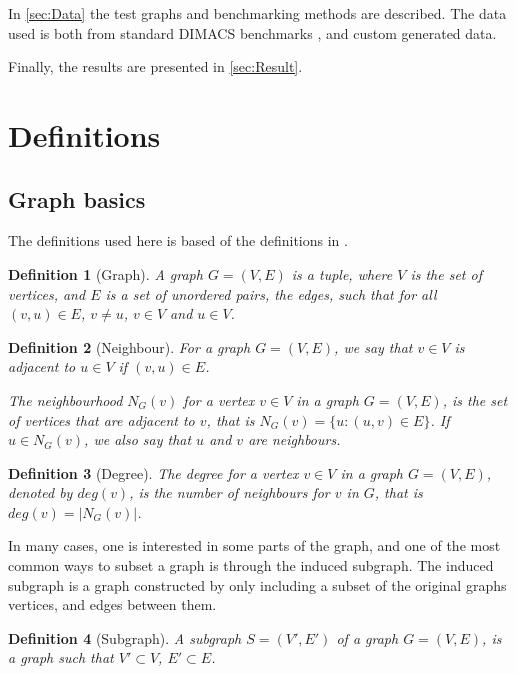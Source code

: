 \documentclass{amsart}
\newtheorem{definition}{Definition}[section]
\begin{document}
In \autoref{sec:Data} the test graphs and benchmarking methods are described. The data
used is both from standard DIMACS benchmarks \cite{DIMACS}, and custom generated data.

Finally, the results are presented in \autoref{sec:Result}.

\section{Definitions}
\label{sec:Definitions}

\subsection{Graph basics}
\label{sec:GraphBasics}

The definitions used here is based of the definitions in 
\cite{GraphBasics}.

\begin{definition}[Graph]
    A graph $G = (V,E)$ is a tuple, where $V$ is the set of vertices, and $E$ is
    a set of unordered pairs, the edges, such that for all $(v,u) \in E$,
    $v \neq u$, $v \in V$ and $u \in V$.
\end{definition}
\begin{definition}[Neighbour]
    For a graph $G = (V,E)$, we say that $v \in V$ is adjacent to 
    $u \in V$ if $(v,u) \in E$. 

    The neighbourhood $N_G(v)$ for a vertex $v \in V$ in a graph $G = (V,E)$,
    is the set of vertices that are adjacent to $v$, that is 
    $N_G(v) = \{u : (u,v) \in E \}$. If $u \in N_G(v)$, we also say
    that $u$ and $v$ are neighbours.
\end{definition}
\begin{definition}[Degree]
    The degree for a vertex $v \in V$ in a graph $G = (V,E)$, denoted by 
    $deg(v)$, is the number of neighbours for $v$ in $G$, that is 
    $deg(v) = |N_G(v)|$.
\end{definition}

In many cases, one is interested in some parts of the graph, and one of the
most common ways to subset a graph is through the induced subgraph. The induced
subgraph is a graph constructed by only including a subset of the original
graphs vertices, and edges between them.

\begin{definition}[Subgraph]
    A subgraph $S = (V',E')$ of a graph $G = (V,E)$, is a graph such that
    $V' \subset V$, $E' \subset E$.
\end{definition}
\end{document}
